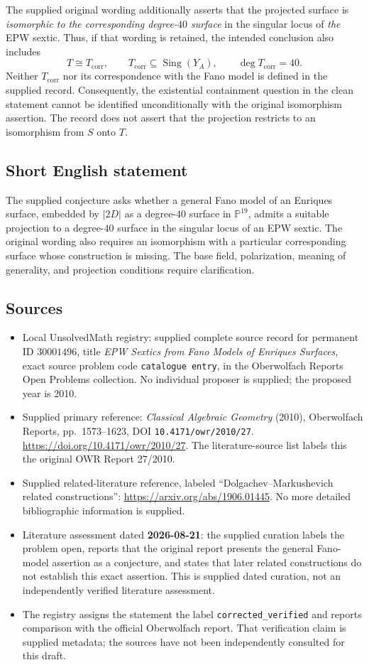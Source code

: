\documentclass[11pt]{article}
\begin{document}
The supplied original wording additionally asserts that the projected surface is \emph{isomorphic to the corresponding degree-\(40\) surface} in the singular locus of \emph{the} EPW sextic. Thus, if that wording is retained, the intended conclusion also includes
\[
T\cong T_{\mathrm{corr}},
\qquad
T_{\mathrm{corr}}\subseteq\operatorname{Sing}(Y_A),
\qquad
\deg T_{\mathrm{corr}}=40.
\]
Neither \(T_{\mathrm{corr}}\) nor its correspondence with the Fano model is defined in the supplied record. Consequently, the existential containment question in the clean statement cannot be identified unconditionally with the original isomorphism assertion. The record does not assert that the projection restricts to an isomorphism from \(S\) onto \(T\).
\subsection{Short English statement}
The supplied conjecture asks whether a general Fano model of an Enriques surface, embedded by \(|2D|\) as a degree-\(40\) surface in \(\mathbb P^{19}\), admits a suitable projection to a degree-\(40\) surface in the singular locus of an EPW sextic. The original wording also requires an isomorphism with a particular corresponding surface whose construction is missing. The base field, polarization, meaning of generality, and projection conditions require clarification.
\subsection{Sources}
\begin{itemize}
\item Local UnsolvedMath registry: supplied complete source record for permanent ID \(30001496\), title \emph{EPW Sextics from Fano Models of Enriques Surfaces}, exact source problem code \texttt{catalogue entry}, in the Oberwolfach Reports Open Problems collection. No individual proposer is supplied; the proposed year is 2010.
\item Supplied primary reference: \emph{Classical Algebraic Geometry} (2010), Oberwolfach Reports, pp.\ 1573--1623, DOI \texttt{10.4171/owr/2010/27}. \url{https://doi.org/10.4171/owr/2010/27}. The literature-source list labels this the original OWR Report 27/2010.
\item Supplied related-literature reference, labeled ``Dolgachev--Markushevich related constructions'': \url{https://arxiv.org/abs/1906.01445}. No more detailed bibliographic information is supplied.
\item Literature assessment dated \textbf{2026-08-21}: the supplied curation labels the problem open, reports that the original report presents the general Fano-model assertion as a conjecture, and states that later related constructions do not establish this exact assertion. This is supplied dated curation, not an independently verified literature assessment.
\item The registry assigns the statement the label \texttt{corrected\_verified} and reports comparison with the official Oberwolfach report. That verification claim is supplied metadata; the sources have not been independently consulted for this draft.
\end{itemize}
\end{document}
